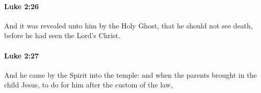 		\paragraph{Luke 2:26} %
			\label{LUKE-2-26}

			And it was revealed unto him by the Holy Ghost, that he should not see death, before he had seen the Lord's Christ.

			\begin{framed}
			\scriptsize
				\begin{compactdesc}
					\item[SBLG] 
				\end{compactdesc}
			\end{framed}

		\paragraph{Luke 2:27} %
			\label{LUKE-2-27}

			And he came by the Spirit into the temple: and when the parents brought in the child Jesus, to do for him after the custom of the law,

